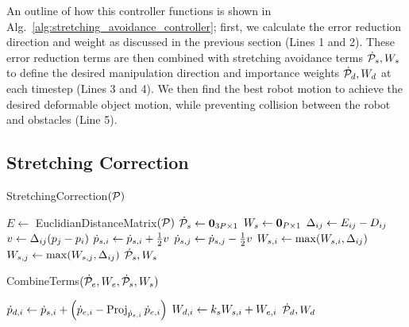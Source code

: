 An outline of how this controller functions is shown in Alg.~\ref{alg:stretching_avoidance_controller}; first, we calculate the error reduction direction and weight as discussed in the previous section (Lines 1 and 2). These error reduction terms are then combined with stretching avoidance terms $\dot{\mathcal{P}}_s, W_s$ to define the desired manipulation direction and importance weights $\dot{\mathcal{P}}_d, W_d$ at each timestep (Lines 3 and 4). We then find the best robot motion to achieve the desired deformable object motion, while preventing collision between the robot and obstacles (Line 5).

\subsection{Stretching Correction}
\label{sec:stretching_correction}

\begin{algorithm}[ht]
\caption{StretchingCorrection$(\mathcal{P})$}
\begin{algorithmic}[1]
    \State $E \gets$ EuclidianDistanceMatrix$(\mathcal{P})$
    \State $\dot{\mathcal{P}}_s \gets \mathbf{0}_{{3P} \times 1}$
    \State $W_s \gets \mathbf{0}_{P \times 1}$
                \State $\Delta_{i j} \gets E_{i j} - D_{i j}$
                \State $v \gets \Delta_{i j}(p_j - p_i)$
                \State $\dot{p}_{s,i} \gets \dot{p}_{s,i} + \frac{1}{2}v$
                \State $\dot{p}_{s,j} \gets \dot{p}_{s,j} - \frac{1}{2}v$
                \State $W_{s,i} \gets \max (W_{s,i}, \Delta_{i j})$
                \State $W_{s,j} \gets \max (W_{s,j}, \Delta_{i j})$
            \EndIf
        \EndFor
    \EndFor
    \State \Return $\dot{\mathcal{P}}_s, W_s$
\end{algorithmic}
\label{alg:stretching_correction_ijrr}
\end{algorithm}

\begin{algorithm}[ht]
\caption{CombineTerms$(\dot{\mathcal{P}}_e, W_e, \dot{\mathcal{P}}_s, W_s)$}
\begin{algorithmic}[1]
        \State $\dot{p}_{d,i} \gets \dot{p}_{s,i} + \left( \dot{p}_{e,i} - \operatorname*{Proj}_{\dot{p}_{s,i}} \dot{p}_{e,i} \right)$
        \State $W_{d,i} \gets k_s W_{s,i} + W_{e,i}$
    \EndFor
    \State \Return $\dot{\mathcal{P}}_d, W_d$
\end{algorithmic}
\label{alg:combine_terms}
\end{algorithm}


